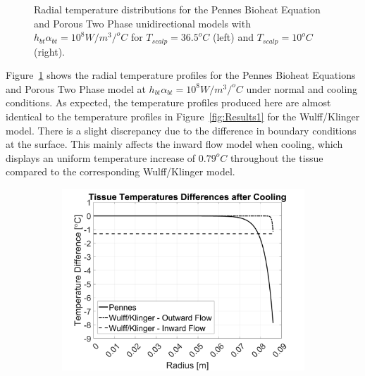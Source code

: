 \documentclass[11pt,english,a4paper,twoside,openright]{report}
\begin{document}
{{{{{{{{\begin{figure}[h]
\begin{subfigure}[b]{0.49\textwidth}
	\end{subfigure}
	\caption[Radial temperature distributions for the Pennes Bioheat Equation and Porous Two Phase unidirectional models with $h_{bt}\alpha_{bt} = 10^{8}W/m^{3}/^{o}C$ for $T_{scalp}=36.5^{o}C$ and $T_{scalp}=10^{o}C$]{Radial temperature distributions for the Pennes Bioheat Equation and Porous Two Phase unidirectional models with $h_{bt}\alpha_{bt} = 10^{8}W/m^{3}/^{o}C$ for $T_{scalp}=36.5^{o}C$ (left) and $T_{scalp}=10^{o}C$ (right).}
	\label{fig:Results3}
\end{figure}

Figure~\ref{fig:Results3} shows the radial temperature profiles for the Pennes Bioheat Equations and Porous Two Phase model at $h_{bt}\alpha_{bt} = 10^{8}W/m^{3}/^{o}C$ under normal and cooling conditions. As expected, the temperature profiles produced here are almost identical to the temperature profiles in Figure~\ref{fig:Results1} for the Wulff/Klinger model. There is a slight discrepancy due to the difference in boundary conditions at the surface. This mainly affects the inward flow model when cooling, which displays an uniform temperature increase of $0.79^{o}C$ throughout the tissue compared to the corresponding Wulff/Klinger model.

\begin{figure}[h]
	\centering
	\begin{subfigure}[b]{0.49\textwidth}
		\includegraphics[width=\textwidth]{1DHemisphere/figure7}
	\end{subfigure}
	

\end{figure}}}}}}}}}
\end{document}
